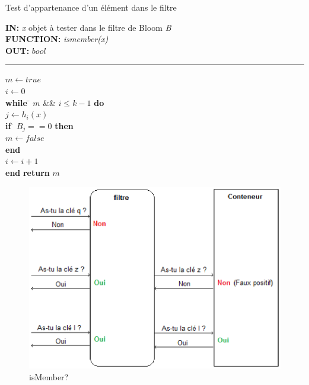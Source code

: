 \begin{algorithme}
	Test d'appartenance d'un élément dans le filtre
\end{algorithme}

\begin{flushleft}
	\begin{framed}
		\textbf{IN:} \emph{x} objet à tester dans le filtre de Bloom \textit{B}\\
		\textbf{FUNCTION:} \textit{ismember(x)}\\
		\textbf{OUT:} $bool$

		\noindent\rule{\linewidth}{0.5pt}

		\begin{tabbing}
			$m \leftarrow true$\\
			$i \leftarrow 0$\\
			\textbf{while} \= $m$ \&\& $i \leq k - 1$ \textbf{do}\\
					\> $j \leftarrow h_i(x)$\\
					\> \textbf{if} \= $B_j == 0$ \textbf{then}\\
					\> \> $m \leftarrow false$\\
					\> \textbf{end}\\
					\> $i \leftarrow i + 1$\\
			\textbf{end}
			\textbf{return} $m$\\
	    	\end{tabbing}		
	\end{framed}
\end{flushleft}

\begin{figure}[!htbp]
	\centering
	\includegraphics[width=12cm]{ismember.eps}
	\caption{isMember?}
\end{figure}	

	
	
	
	
	
	
	
	
	
	
	
	
	
	
	
	
	
	
	
	
	